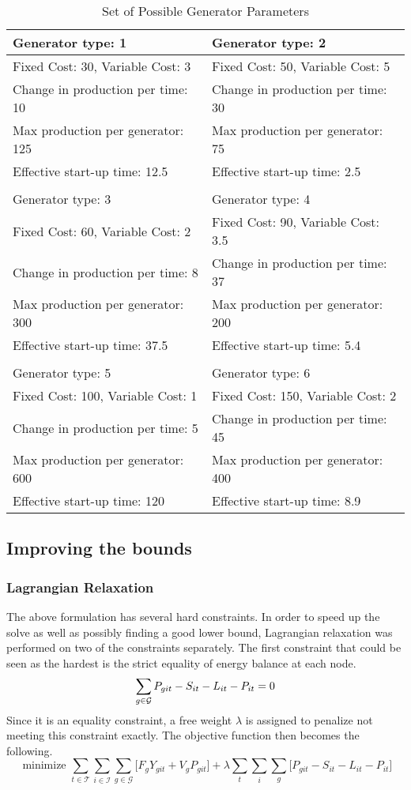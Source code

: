 \begin{table}
\caption{Set of Possible Generator Parameters}
  \begin{tabular}{ l l }
Generator type: 1  	&	 Generator type: 2	\\
\hline
Fixed Cost: 30, Variable Cost: 3 	&	Fixed Cost: 50, Variable Cost: 5 	\\
Change in production per time: 10  	&	Change in production per time: 30 	\\
Max production per generator: 125 	&	Max production per generator: 75   	\\
Effective start-up time: 12.5  		&	Effective start-up time: 2.5	\\
  &    \\
 Generator type: 3			&	 Generator type: 4	\\
\hline
 Fixed Cost: 60, Variable Cost: 2	&	  Fixed Cost: 90, Variable Cost: 3.5	\\
Change in production per time: 8  	&	Change in production per time: 37	\\
Max production per generator: 300 	&	Max production per generator: 200	\\
Effective start-up time: 37.5 		&	Effective start-up time: 5.4	\\
	&	\\
Generator type: 5			&	Generator type: 6	\\
\hline
 Fixed Cost: 100, Variable Cost: 1 	&	Fixed Cost: 150, Variable Cost: 2	\\
Change in production per time: 5	&	Change in production per time: 45	\\
Max production per generator: 600 	&	Max production per generator: 400	\\
Effective start-up time: 120		&	Effective start-up time: 8.9 	
  \end{tabular}
\end{table}
\subsection{Improving the bounds}
\subsubsection{Lagrangian Relaxation}
The above formulation has several hard constraints. In order to speed up the solve as well as
possibly finding a good lower bound, Lagrangian relaxation was performed on two of the constraints
separately. The first constraint that could be seen as the hardest is the strict equality of energy balance
at each node. 
\begin{equation}
\sum_{g \in \mathcal{G}} P_{git} - S_{it} - L_{it} - P_{it} = 0
\end{equation}
Since it is an equality constraint, a free weight $\lambda$ is assigned to penalize not meeting this
constraint exactly. The objective function then becomes the following. 
\begin{equation}
\mbox{ minimize }  \sum_{t \in \mathcal{T}} \sum_{i \in \mathcal{I}} \sum_{g \in \mathcal{G}} \biggl[  F_g Y_{git} + V_g P_{git} \biggr]  + \lambda \sum_t \sum_i \sum_g \biggl[   P_{git} - S_{it} - L_{it} - P_{it}  \biggr]
\end{equation}

